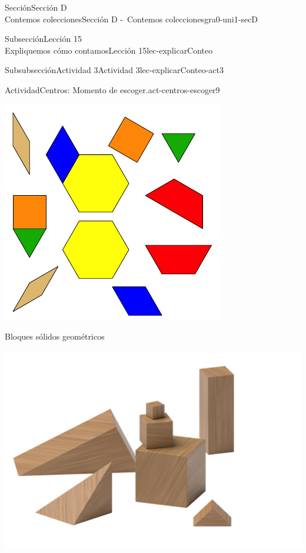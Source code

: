 \begin{sectionptx}{Sección}{{\Large Sección D\\}Contemos colecciones}{}{Sección D -~Contemos colecciones}{}{}{gra0-uni1-secD}
\begin{subsectionptx}{Subsección}{{\normalsize Lección 15\\[-0.05cm]}Expliquemos cómo contamos}{}{Lección 15}{}{}{lec-explicarConteo}
\begin{subsubsectionptx}{Subsubsección}{Actividad 3}{}{Actividad 3}{}{}{lec-explicarConteo-act3}
\begin{activity}{Actividad}{Centros: Momento de escoger.}{act-centros-escoger9}
\begin{sidebyside}{2}{0.025}{0.025}{0.05}
\begin{sbspanel}{0.45}
\includegraphics[max width=\linewidth, center]{external/svg-source/tikz-file-147344.pdf}
\end{sbspanel}%
\end{sidebyside}%
\vspace*{1ex minus 0.8ex}
\begin{sidebyside}{2}{0.025}{0.025}{0.05}%
\begin{sbspanel}{0.45}%
Bloques sólidos geométricos%
\par
\includegraphics[max width=\linewidth, center]{external/png-source/K.1.A Beta Student Workbook.Geoblocks.png}

\end{sbspanel}
\end{sidebyside}
\end{activity}
\end{subsubsectionptx}
\end{subsectionptx}
\end{sectionptx}
